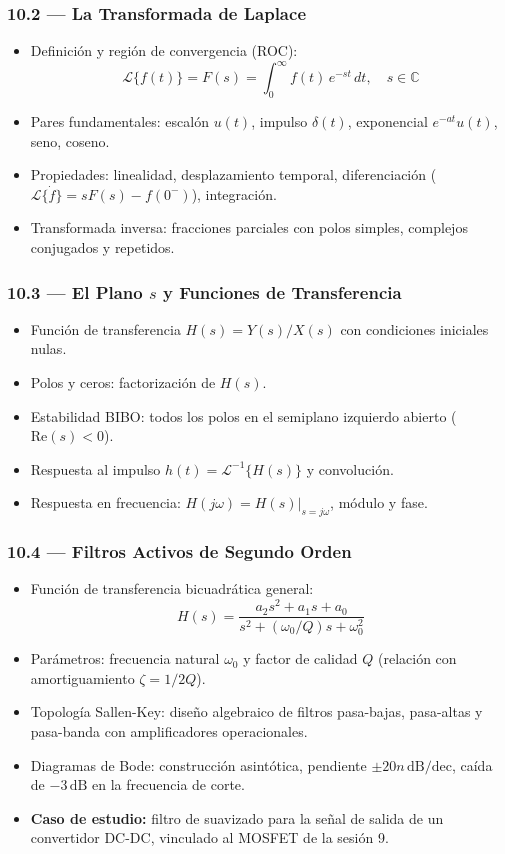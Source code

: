 \documentclass[11pt, letterpaper]{article}
\begin{document}
\subsubsection{10.2 — La Transformada de Laplace}
\begin{itemize}
  \item Definición y región de convergencia (ROC):
    \[\mathcal{L}\{f(t)\}=F(s)=\int_0^\infty f(t)\,e^{-st}\,dt,\quad s\in\mathbb{C}\]
  \item Pares fundamentales: escalón $u(t)$, impulso $\delta(t)$, exponencial $e^{-at}u(t)$, seno, coseno.
  \item Propiedades: linealidad, desplazamiento temporal, diferenciación ($\mathcal{L}\{\dot{f}\}=sF(s)-f(0^-)$), integración.
  \item Transformada inversa: fracciones parciales con polos simples, complejos conjugados y repetidos.
\end{itemize}

\subsubsection{10.3 — El Plano $s$ y Funciones de Transferencia}
\begin{itemize}
  \item Función de transferencia $H(s)=Y(s)/X(s)$ con condiciones iniciales nulas.
  \item Polos y ceros: factorización de $H(s)$.
  \item Estabilidad BIBO: todos los polos en el semiplano izquierdo abierto ($\text{Re}(s)<0$).
  \item Respuesta al impulso $h(t)=\mathcal{L}^{-1}\{H(s)\}$ y convolución.
  \item Respuesta en frecuencia: $H(j\omega)=H(s)|_{s=j\omega}$, módulo y fase.
\end{itemize}

\subsubsection{10.4 — Filtros Activos de Segundo Orden}
\begin{itemize}
  \item Función de transferencia bicuadrática general:
    \[H(s)=\frac{a_2s^2+a_1s+a_0}{s^2+(\omega_0/Q)s+\omega_0^2}\]
  \item Parámetros: frecuencia natural $\omega_0$ y factor de calidad $Q$ (relación con amortiguamiento $\zeta=1/2Q$).
  \item Topología Sallen-Key: diseño algebraico de filtros pasa-bajas, pasa-altas y pasa-banda con amplificadores operacionales.
  \item Diagramas de Bode: construcción asintótica, pendiente $\pm 20n\,\text{dB/dec}$, caída de $-3\,\text{dB}$ en la frecuencia de corte.
  \item \textbf{Caso de estudio:} filtro de suavizado para la señal de salida de un convertidor DC-DC, vinculado al MOSFET de la sesión 9.
\end{itemize}
\end{document}
